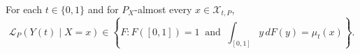 For each \(t\in\{0,1\}\) and for \(P_X\)-almost every \(x\in\mathcal X_{t,P}\),
\[
 \mathcal L_P(Y(t)\mid X=x)
 \in\left\{F:F([0,1])=1\ \text{ and }\ \int_{[0,1]}y\,dF(y)=\mu_t(x)\right\}.
\]